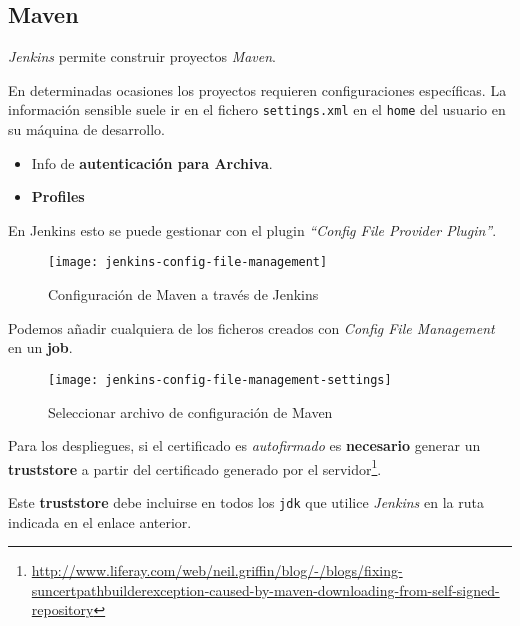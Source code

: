 \subsection{Maven}
\label{sub:jenkins-maven}

\par \emph{Jenkins} permite construir proyectos \emph{Maven}.

\par En determinadas ocasiones los proyectos requieren configuraciones específicas. La información sensible suele ir en el fichero \texttt{settings.xml} en el \texttt{home} del usuario en su máquina de desarrollo.

\begin{itemize}
    \item Info de \textbf{autenticación para Archiva}.
    \item \textbf{Profiles}
\end{itemize}

\par En Jenkins esto se puede gestionar con el plugin \emph{``Config File Provider Plugin''}.

\begin{figure}[H]
    \centering
    \texttt{[image: jenkins-config-file-management]}
    \caption{Configuración de Maven a través de Jenkins}
    \label{fig:jenkins-config-file-management}
\end{figure}

\par Podemos añadir cualquiera de los ficheros creados con \emph{Config File Management} en un \textbf{job}.

\begin{figure}[H]
    \centering
    \texttt{[image: jenkins-config-file-management-settings]}
    \caption{Seleccionar archivo de configuración de Maven}
    \label{fig:jenkins-config-file-management-settings}
\end{figure}

\par Para los despliegues, si el certificado es \emph{autofirmado} es \textbf{necesario} generar un \textbf{truststore} a partir del certificado generado por el servidor\footnote{\url{http://www.liferay.com/web/neil.griffin/blog/-/blogs/fixing-suncertpathbuilderexception-caused-by-maven-downloading-from-self-signed-repository}}.

\par Este \textbf{truststore} debe incluirse en todos los \texttt{jdk} que utilice \emph{Jenkins} en la ruta indicada en el enlace anterior.

